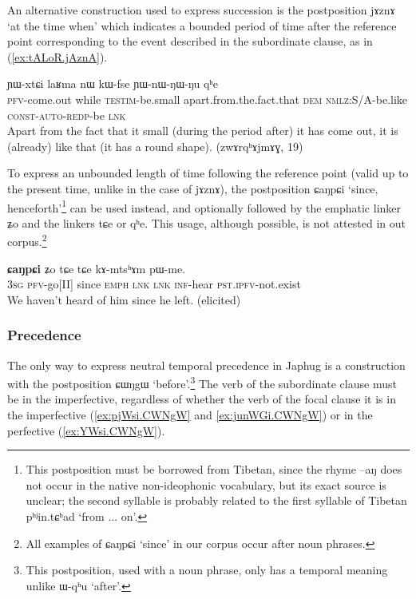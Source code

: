\documentclass[oldfontcommands,oneside,a4paper,11pt]{article}
\newcommand{\ipa}[1]{{\phon \mbox{#1}}} %
\newcommand{\refb}[1]{(\ref{#1})}
\begin{document}
An alternative construction used to express succession is the postposition \ipa{jɤznɤ} `at the time when' which indicates a bounded period of time after the reference point corresponding to the event described in the subordinate clause, as in \refb{ex:tALoR.jAznA}.

\begin{exe}
\ex \label{ex:tALoR.jAznA}
\gll 
[\ipa{tɤ-ɬoʁ}]  	\ipa{\textbf{jɤznɤ}}  	\ipa{ɲɯ-xtɕi}  	\ipa{laʁma}  	\ipa{nɯ}  	\ipa{kɯ-fse}  	\ipa{ɲɯ-nɯ-ŋɯ-ŋu}  	\ipa{qʰe}  \\
\textsc{pfv}-come.out  while \textsc{testim}-be.small apart.from.the.fact.that \textsc{dem} \textsc{nmlz}:S/A-be.like \textsc{const-auto-redp}-be \textsc{lnk} \\
\glt Apart from the fact that it small (during the period after) it has come out, it is (already) like that (it has a round shape). (zwɤrqʰɤjmɤɣ, 19)
	\end{exe}


 To express an unbounded length of time following the reference point (valid up to the present time, unlike in the case of \ipa{jɤznɤ}), the postposition \ipa{ɕaŋpɕi} `since, henceforth'\footnote{This postposition must be borrowed from Tibetan, since the rhyme \ipa{--aŋ} does not occur in the native non-ideophonic vocabulary, but its exact source is unclear; the second syllable is probably related to the first syllable of Tibetan \ipa{pʰʲin.tɕʰad} `from ... on'.} can be used instead, and optionally followed by the emphatic linker \ipa{ʑo} and the linkers \ipa{tɕe} or \ipa{qʰe}. This usage, although possible, is not attested in out corpus.\footnote{All examples of \ipa{ɕaŋpɕi} `since' in our corpus occur after noun phrases.}
  \begin{exe}
\ex \label{ex:jariCaNpCi} 
\gll
 [\ipa{ɯʑo}   	\ipa{jɤ-ari}]   	\textbf{\ipa{ɕaŋpɕi}}   	\ipa{ʑo}   	\ipa{tɕe}   	\ipa{tɕe}   	\ipa{kɤ-mtsʰɤm}   	\ipa{pɯ-me.}   	\\
\textsc{3sg} \textsc{pfv}-go[II] since \textsc{emph} \textsc{lnk}  \textsc{lnk} \textsc{inf}-hear \textsc{pst.ipfv}-not.exist \\
 \glt We haven't heard of him since he left. (elicited)
\end{exe}
 


\subsubsection{Precedence} \label{sec:precedence}
The only way to express neutral temporal precedence  in Japhug  is a construction with the postposition  \ipa{ɕɯŋgɯ} `before'.\footnote{This postposition, used with a noun phrase, only has a temporal meaning unlike \ipa{ɯ-qʰu} `after'.} The verb of the subordinate clause must be in the imperfective, regardless of whether the verb of the focal clause it is in the imperfective  (\ref{ex:pjWsi.CWNgW} and \ref{ex:junWGi.CWNgW}) or in the perfective   \refb{ex:YWsi.CWNgW}.
\end{document}
